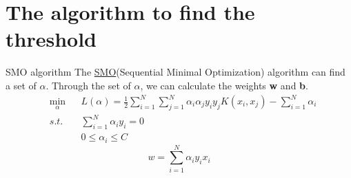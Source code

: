 \documentclass[10pt]{beamer}
\begin{document}
\section{The algorithm to find the threshold}


\begin{frame}{SMO algorithm}
The \href{https://www.microsoft.com/en-us/research/wp-content/uploads/2016/02/tr-98-14.pdf}{SMO}(Sequential Minimal Optimization) algorithm can find a set of $\alpha$.
Through the set of $ \alpha $, we can calculate the weights \textbf{w} and \textbf{b}.
\begin{equation}
    \begin{aligned}
   & \underset{\alpha}{\min}&&L(\alpha)=\frac{1}{2}\sum_{i=1}^{N}\sum_{j=1}^{N}
    \alpha_i\alpha_jy_iy_jK(x_i,x_j)-\sum_{i=1}^{N}\alpha_i \\
   & s.t. &&\sum_{i=1}^{N}\alpha_iy_i=0 \\
   & && 0 \leq\alpha_i\leq C 
    \end{aligned}
    \label{Cons_cond}
\end{equation}
\begin{equation}
 w =\sum_{i=1}^N\alpha_i y_ix_i
 \end{equation}
\end{frame}
\end{document}
